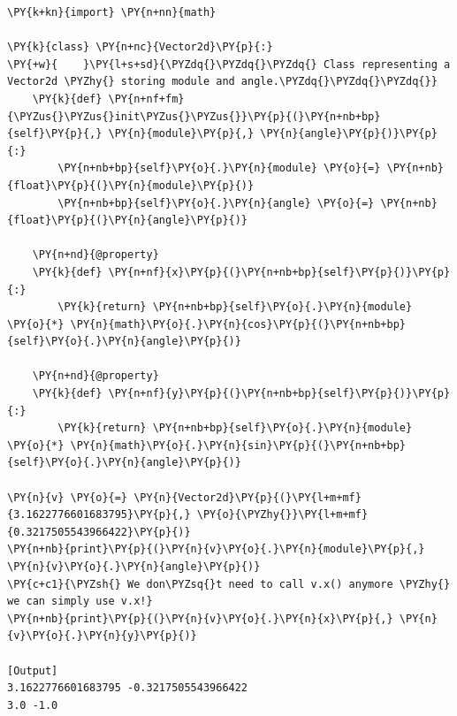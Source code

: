 \begin{Verbatim}[label=\makebox{\url{https://github.com/lucabaldini/cmepda/tree/master/slides/latex/snippets/vector2d\_property.py}},commandchars=\\\{\}]
\PY{k+kn}{import} \PY{n+nn}{math}

\PY{k}{class} \PY{n+nc}{Vector2d}\PY{p}{:}
\PY{+w}{    }\PY{l+s+sd}{\PYZdq{}\PYZdq{}\PYZdq{} Class representing a Vector2d \PYZhy{} storing module and angle.\PYZdq{}\PYZdq{}\PYZdq{}}   
    \PY{k}{def} \PY{n+nf+fm}{\PYZus{}\PYZus{}init\PYZus{}\PYZus{}}\PY{p}{(}\PY{n+nb+bp}{self}\PY{p}{,} \PY{n}{module}\PY{p}{,} \PY{n}{angle}\PY{p}{)}\PY{p}{:}
        \PY{n+nb+bp}{self}\PY{o}{.}\PY{n}{module} \PY{o}{=} \PY{n+nb}{float}\PY{p}{(}\PY{n}{module}\PY{p}{)}
        \PY{n+nb+bp}{self}\PY{o}{.}\PY{n}{angle} \PY{o}{=} \PY{n+nb}{float}\PY{p}{(}\PY{n}{angle}\PY{p}{)}
   
    \PY{n+nd}{@property}
    \PY{k}{def} \PY{n+nf}{x}\PY{p}{(}\PY{n+nb+bp}{self}\PY{p}{)}\PY{p}{:}
        \PY{k}{return} \PY{n+nb+bp}{self}\PY{o}{.}\PY{n}{module} \PY{o}{*} \PY{n}{math}\PY{o}{.}\PY{n}{cos}\PY{p}{(}\PY{n+nb+bp}{self}\PY{o}{.}\PY{n}{angle}\PY{p}{)}
    
    \PY{n+nd}{@property}
    \PY{k}{def} \PY{n+nf}{y}\PY{p}{(}\PY{n+nb+bp}{self}\PY{p}{)}\PY{p}{:}
        \PY{k}{return} \PY{n+nb+bp}{self}\PY{o}{.}\PY{n}{module} \PY{o}{*} \PY{n}{math}\PY{o}{.}\PY{n}{sin}\PY{p}{(}\PY{n+nb+bp}{self}\PY{o}{.}\PY{n}{angle}\PY{p}{)}
  
\PY{n}{v} \PY{o}{=} \PY{n}{Vector2d}\PY{p}{(}\PY{l+m+mf}{3.1622776601683795}\PY{p}{,} \PY{o}{\PYZhy{}}\PY{l+m+mf}{0.3217505543966422}\PY{p}{)}
\PY{n+nb}{print}\PY{p}{(}\PY{n}{v}\PY{o}{.}\PY{n}{module}\PY{p}{,} \PY{n}{v}\PY{o}{.}\PY{n}{angle}\PY{p}{)}
\PY{c+c1}{\PYZsh{} We don\PYZsq{}t need to call v.x() anymore \PYZhy{} we can simply use v.x!}
\PY{n+nb}{print}\PY{p}{(}\PY{n}{v}\PY{o}{.}\PY{n}{x}\PY{p}{,} \PY{n}{v}\PY{o}{.}\PY{n}{y}\PY{p}{)}

[Output]
3.1622776601683795 -0.3217505543966422
3.0 -1.0
\end{Verbatim}